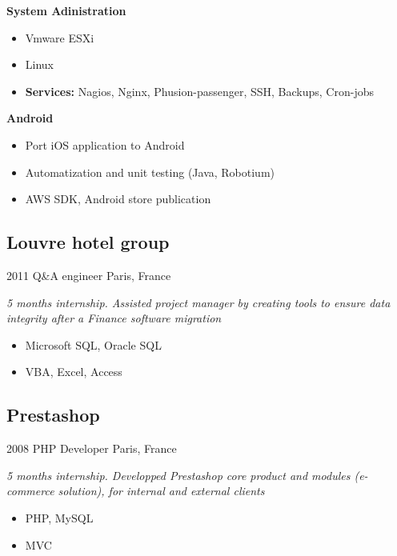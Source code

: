 \documentclass[]{template/friggeri-cv} %
\begin{document}
\begin{entrylist}
{%
\textbf{System Adinistration} 
\begin{itemize}
\item Vmware ESXi
\item Linux
\item \textbf{Services:} Nagios, Nginx, Phusion-passenger, SSH, Backups, Cron-jobs
\end{itemize}

\textbf{Android} 
\begin{itemize}
\item Port iOS application to Android
\item Automatization and unit testing (Java, Robotium)
\item AWS SDK, Android store publication
\end{itemize}
}

\end{entrylist}



\subsection{Louvre hotel group}
\begin{entrylist}
\entry
{2011}
{Q\&A engineer}
{Paris, France}
{\emph{5 months internship. Assisted project manager by creating tools to ensure data integrity after a Finance software migration}

\begin{itemize}
\item {Microsoft SQL, Oracle SQL}
\item {VBA, Excel, Access}

\end{itemize}
}
\end{entrylist}

\goodbreak
\subsection{Prestashop}
\begin{entrylist}
\entry
{2008}
{PHP Developer}
{Paris, France}
{\emph{5 months internship. Developped Prestashop core product and modules (e-commerce solution), for internal and external clients}

\begin{itemize}

\item {PHP, MySQL}
\item {MVC}

\end{itemize}
}
\end{entrylist}
\end{document}
